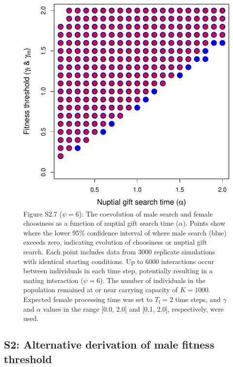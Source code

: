 \documentclass[
]{article}
\begin{document}
\begin{figure}
\centering
\includegraphics{SI_files/figure-latex/unnamed-chunk-7-1.pdf}
\caption{Figure S2.7 (\(\psi = 6\)): The coevolution of male search and
female choosiness as a function of nuptial gift search time
(\(\alpha\)). Points show where the lower 95\% confidence interval of
where male search (blue) exceeds zero, indicating evolution of
choosiness or nuptial gift search. Each point includes data from 3000
replicate simulations with identical starting conditions. Up to 6000
interactions occur between individuals in each time step, potentially
resulting in a mating interaction (\(\psi = 6\)). The number of
individuals in the population remained at or near carrying capacity of
\(K = 1000\). Expected female processing time was set to
\(T_{\mathrm{f}}=2\) time steps, and \(\gamma\) and \(\alpha\) values in
the range {[}0.0, 2.0{]} and {[}0.1, 2.0{]}, respectively, were used.}
\end{figure}

\captionsetup{labelformat=default}

\clearpage

\hypertarget{s2-alternative-derivation-of-male-fitness-threshold}{%
\subsection{S2: Alternative derivation of male fitness
threshold}\label{s2-alternative-derivation-of-male-fitness-threshold}}
\end{document}
